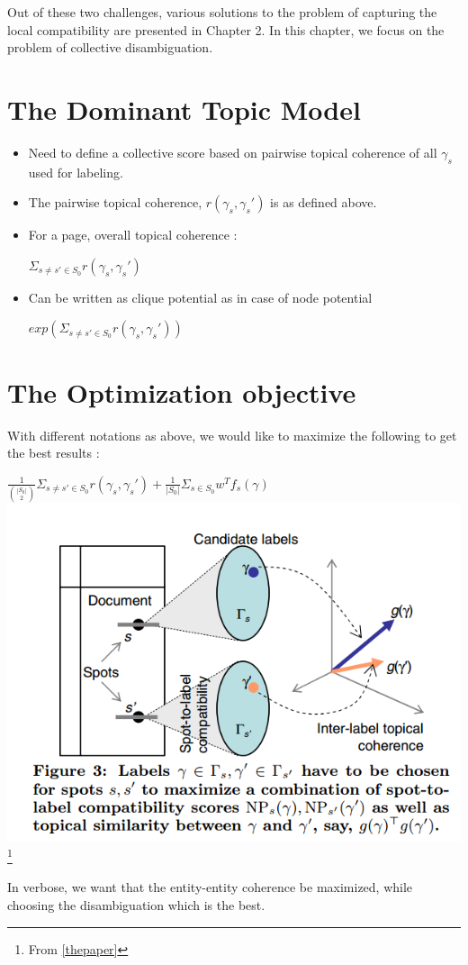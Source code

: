  Out of these two challenges, various solutions to the problem of capturing the local compatibility are presented in Chapter 2. 
 In this chapter, we focus on the problem of collective disambiguation. 
 
 \section{The Dominant Topic Model}
  \begin{itemize}
   \item Need to define a collective score based on pairwise topical coherence of all $\gamma_s$ used for labeling. \medskip
   \item The pairwise topical coherence, $r(\gamma_s, \gamma_s')$ is as defined above.\medskip
   \item For a page, overall topical coherence : \begin{center}\medskip
                                                  $\Sigma_{s \neq s' \in S_0}r(\gamma_s, \gamma_s')$
                                                 \end{center}
   \item Can be written as clique potential as in case of node potential\medskip
      \begin{center}
	$exp(\Sigma_{s \neq s' \in S_0}r(\gamma_s, \gamma_s'))$
      \end{center}

  \end{itemize}

  \section{The Optimization objective}
  With different notations as above, we would like to maximize the following to get the 
  best results :
 \begin{center}
 $\frac{1}{\binom{|S_0|}{2}}\Sigma_{s \neq s' \in S_0}r(\gamma_s, \gamma_s') + \frac{1}{|S_0|}\Sigma_{s \in S_0}w^{T}f_s(\gamma)$
\includegraphics[height = 5 cm]{objective}\footnote{From \ref{thepaper}}
  \end{center}
  In verbose, we want that the entity-entity coherence be maximized, while choosing the disambiguation which is the best.


